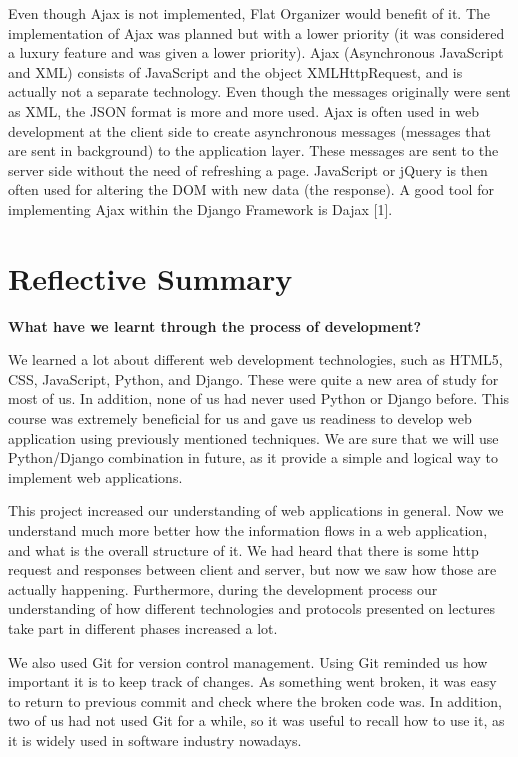 \documentclass{sig-alt-release2}
\begin{document}
Even though Ajax is not implemented, Flat Organizer would benefit of it. The implementation of Ajax was planned but with a lower priority (it was considered a luxury feature and was given a lower priority). Ajax (Asynchronous JavaScript and XML) consists of JavaScript and the object XMLHttpRequest, and is actually not a separate technology. Even though the messages originally were sent as XML, the JSON format is more and more used. Ajax is often used in web development at the client side to create asynchronous messages (messages that are sent in background) to the application layer. These messages are sent to the server side without the need of refreshing a page. JavaScript or jQuery is then often used for altering the DOM with new data (the response). A good tool for implementing Ajax within the Django Framework is Dajax [1].

\section{Reflective Summary}

\textbf{What have we learnt through the process of development?}

We learned a lot about different web development technologies, such as HTML5, CSS, JavaScript, Python, and Django. These were quite a new area of study for most of us. In addition, none of us had never used Python or Django before. This course was extremely beneficial for us and gave us readiness to develop web application using previously mentioned techniques. We are sure that we will use Python/Django combination in future, as it provide a simple and logical way to implement web applications. 

This project increased our understanding of web applications in general. Now we understand much more better how the information flows in a web application, and what is the overall structure of it. We had heard that there is some http request and responses between client and server, but now we saw how those are actually happening. Furthermore, during the development process our understanding of how different technologies and protocols presented on lectures take part in different phases increased a lot.

We also used Git for version control management. Using Git reminded us how important it is to keep track of changes. As something went broken, it was easy to return to previous commit and check where the broken code was. In addition, two of us had not used Git for a while, so it was useful to recall how to use it, as it is widely used in software industry nowadays. 
\end{document}
